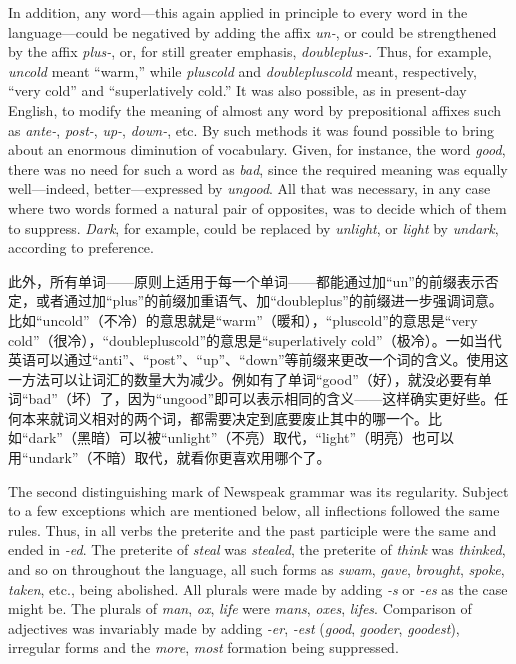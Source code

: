 \begin{paracol}{2}
\switchcolumn*

In addition, any word---this again applied in principle to every word in
the language---could be negatived by adding the affix \emph{un-}, or
could be strengthened by the affix \emph{plus-}, or, for still greater
emphasis, \emph{doubleplus-}. Thus, for example, \emph{uncold} meant
``warm,'' while \emph{pluscold} and \emph{doublepluscold} meant,
respectively, ``very cold'' and ``superlatively cold.'' It was also
possible, as in present-day English, to modify the meaning of almost any
word by prepositional affixes such as \emph{ante-}, \emph{post-},
\emph{up-}, \emph{down-}, etc. By such methods it was found possible to
bring about an enormous diminution of vocabulary. Given, for instance,
the word \emph{good}, there was no need for such a word as \emph{bad},
since the required meaning was equally well---indeed, better---expressed
by \emph{ungood}. All that was necessary, in any case where two words
formed a natural pair of opposites, was to decide which of them to
suppress. \emph{Dark}, for example, could be replaced by \emph{unlight},
or \emph{light} by \emph{undark}, according to preference.

\switchcolumn

此外，所有单词——原则上适用于每一个单词——都能通过加``un''的前缀表示否定，或者通过加``plus''的前缀加重语气、加``doubleplus''的前缀进一步强调词意。比如``uncold''（不冷）的意思就是``warm''（暖和），``pluscold''的意思是``very
cold''（很冷），``doublepluscold''的意思是``superlatively
cold''（极冷）。一如当代英语可以通过``anti''、``post''、``up''、``down''等前缀来更改一个词的含义。使用这一方法可以让词汇的数量大为减少。例如有了单词``good''（好），就没必要有单词``bad''（坏）了，因为``ungood''即可以表示相同的含义——这样确实更好些。任何本来就词义相对的两个词，都需要决定到底要废止其中的哪一个。比如``dark''（黑暗）可以被``unlight''（不亮）取代，``light''（明亮）也可以用``undark''（不暗）取代，就看你更喜欢用哪个了。

\switchcolumn*

The second distinguishing mark of Newspeak grammar was its regularity.
Subject to a few exceptions which are mentioned below, all inflections
followed the same rules. Thus, in all verbs the preterite and the past
participle were the same and ended in \emph{-ed}. The preterite of
\emph{steal} was \emph{stealed}, the preterite of \emph{think} was
\emph{thinked}, and so on throughout the language, all such forms as
\emph{swam}, \emph{gave}, \emph{brought}, \emph{spoke}, \emph{taken},
etc., being abolished. All plurals were made by adding \emph{-s} or
\emph{-es} as the case might be. The plurals of \emph{man}, \emph{ox},
\emph{life} were \emph{mans}, \emph{oxes}, \emph{lifes}. Comparison of
adjectives was invariably made by adding \emph{-er}, \emph{-est}
(\emph{good}, \emph{gooder}, \emph{goodest}), irregular forms and the
\emph{more}, \emph{most} formation being suppressed.


\end{paracol}
